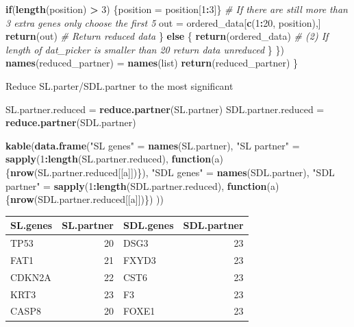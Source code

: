 \documentclass[]{article}
\newenvironment{Shaded}{\begin{snugshade}}{\end{snugshade}}
\newcommand{\KeywordTok}[1]{\textcolor[rgb]{0.13,0.29,0.53}{\textbf{#1}}}
\newcommand{\DecValTok}[1]{\textcolor[rgb]{0.00,0.00,0.81}{#1}}
\newcommand{\StringTok}[1]{\textcolor[rgb]{0.31,0.60,0.02}{#1}}
\newcommand{\CommentTok}[1]{\textcolor[rgb]{0.56,0.35,0.01}{\textit{#1}}}
\newcommand{\ControlFlowTok}[1]{\textcolor[rgb]{0.13,0.29,0.53}{\textbf{#1}}}
\newcommand{\OperatorTok}[1]{\textcolor[rgb]{0.81,0.36,0.00}{\textbf{#1}}}
\newcommand{\NormalTok}[1]{#1}
\begin{document}
\begin{Shaded}
\begin{Highlighting}[]
      \ControlFlowTok{if}\NormalTok{(}\KeywordTok{length}\NormalTok{(position) }\OperatorTok{>}\StringTok{ }\DecValTok{3}\NormalTok{) \{position =}\StringTok{ }\NormalTok{position[}\DecValTok{1}\OperatorTok{:}\DecValTok{3}\NormalTok{]\} }\CommentTok{# If there are still more than 3 extra genes only choose the first 5}
\NormalTok{      out =}\StringTok{ }\NormalTok{ordered_data[}\KeywordTok{c}\NormalTok{(}\DecValTok{1}\OperatorTok{:}\DecValTok{20}\NormalTok{, position),]}
      \KeywordTok{return}\NormalTok{(out) }\CommentTok{# Return reduced data}
\NormalTok{    \} }\ControlFlowTok{else}\NormalTok{ \{}
      \KeywordTok{return}\NormalTok{(ordered_data) }\CommentTok{# (2) If length of dat_picker is smaller than 20 return data unreduced }
\NormalTok{    \}}
\NormalTok{  \})}
  \KeywordTok{names}\NormalTok{(reduced_partner) =}\StringTok{ }\KeywordTok{names}\NormalTok{(list)}
  \KeywordTok{return}\NormalTok{(reduced_partner)}
\NormalTok{\}}
\end{Highlighting}
\end{Shaded}

Reduce SL.parter/SDL.partner to the most significant

\begin{Shaded}
\begin{Highlighting}[]
\NormalTok{SL.partner.reduced =}\StringTok{ }\KeywordTok{reduce.partner}\NormalTok{(SL.partner)}
\NormalTok{SDL.partner.reduced =}\StringTok{ }\KeywordTok{reduce.partner}\NormalTok{(SDL.partner)}

\KeywordTok{kable}\NormalTok{(}\KeywordTok{data.frame}\NormalTok{(}\StringTok{"SL genes"}\NormalTok{ =}\StringTok{ }\KeywordTok{names}\NormalTok{(SL.partner),}
           \StringTok{"SL partner"}\NormalTok{ =}\StringTok{ }\KeywordTok{sapply}\NormalTok{(}\DecValTok{1}\OperatorTok{:}\KeywordTok{length}\NormalTok{(SL.partner.reduced), }\ControlFlowTok{function}\NormalTok{(a)\{}\KeywordTok{nrow}\NormalTok{(SL.partner.reduced[[a]])\}),}
           \StringTok{"SDL genes"}\NormalTok{ =}\StringTok{ }\KeywordTok{names}\NormalTok{(SDL.partner),}
           \StringTok{"SDL partner"}\NormalTok{ =}\StringTok{ }\KeywordTok{sapply}\NormalTok{(}\DecValTok{1}\OperatorTok{:}\KeywordTok{length}\NormalTok{(SDL.partner.reduced), }\ControlFlowTok{function}\NormalTok{(a)\{}\KeywordTok{nrow}\NormalTok{(SDL.partner.reduced[[a]])\})}
\NormalTok{           ))}
\end{Highlighting}
\end{Shaded}

\begin{longtable}[]{@{}lrlr@{}}
\toprule
SL.genes & SL.partner & SDL.genes & SDL.partner\tabularnewline
\midrule
\endhead
TP53 & 20 & DSG3 & 23\tabularnewline
FAT1 & 21 & FXYD3 & 23\tabularnewline
CDKN2A & 22 & CST6 & 23\tabularnewline
KRT3 & 23 & F3 & 23\tabularnewline
CASP8 & 20 & FOXE1 & 23\tabularnewline
\bottomrule
\end{longtable}
\end{document}
